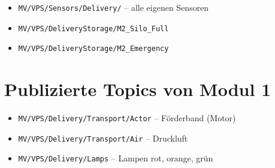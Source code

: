 \begin{itemize}
  \item \texttt{MV/VPS/Sensors/Delivery/\*} -- alle eigenen Sensoren
  \item \texttt{MV/VPS/DeliveryStorage/M2\_Silo\_Full}
  \item \texttt{MV/VPS/DeliveryStorage/M2\_Emergency}
\end{itemize}

\section{Publizierte Topics von Modul 1}

\begin{itemize}
  \item \texttt{MV/VPS/Delivery/Transport/Actor} -- Förderband (Motor)
  \item \texttt{MV/VPS/Delivery/Transport/Air} -- Druckluft
  \item \texttt{MV/VPS/Delivery/Lamps} -- Lampen rot, orange, grün
\end{itemize}
